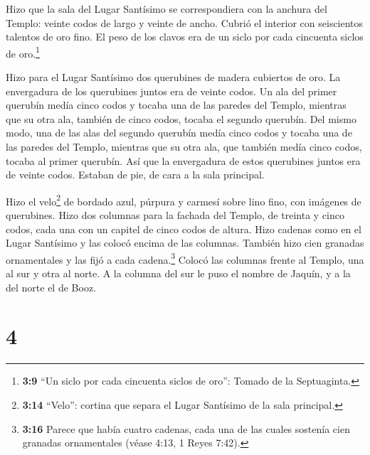  Hizo que la sala del Lugar Santísimo se correspondiera con
la anchura del Templo: veinte codos de largo y veinte de ancho. Cubrió
el interior con seiscientos talentos de oro fino.  El peso
de los clavos era de un siclo por cada cincuenta siclos de
oro.\footnote{\textbf{3:9} ``Un siclo por cada cincuenta siclos de
  oro'': Tomado de la Septuaginta.}

 Hizo para el Lugar Santísimo dos querubines de madera
cubiertos de oro.  La envergadura de los querubines juntos
era de veinte codos. Un ala del primer querubín medía cinco codos y
tocaba una de las paredes del Templo, mientras que su otra ala, también
de cinco codos, tocaba el segundo querubín.  Del mismo
modo, una de las alas del segundo querubín medía cinco codos y tocaba
una de las paredes del Templo, mientras que su otra ala, que también
medía cinco codos, tocaba al primer querubín.  Así que la
envergadura de estos querubines juntos era de veinte codos. Estaban de
pie, de cara a la sala principal.

 Hizo el velo\footnote{\textbf{3:14} ``Velo'': cortina que
  separa el Lugar Santísimo de la sala principal.} de bordado azul,
púrpura y carmesí sobre lino fino, con imágenes de querubines.
 Hizo dos columnas para la fachada del Templo, de treinta y
cinco codos, cada una con un capitel de cinco codos de altura.
 Hizo cadenas como en el Lugar Santísimo y las colocó
encima de las columnas. También hizo cien granadas ornamentales y las
fijó a cada cadena.\footnote{\textbf{3:16} Parece que había cuatro
  cadenas, cada una de las cuales sostenía cien granadas ornamentales
  (véase 4:13, 1 Reyes 7:42).}  Colocó las columnas frente
al Templo, una al sur y otra al norte. A la columna del sur le puso el
nombre de Jaquín, y a la del norte el de Booz.

\hypertarget{section-3}{%
\section{4}\label{section-3}}

